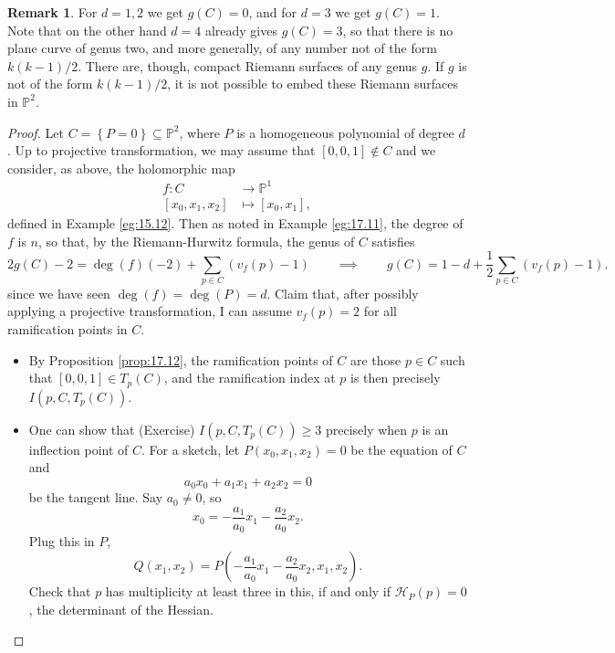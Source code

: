 \documentclass{article}
\renewcommand{\P}{\mathbb{P}}
\renewcommand{\H}{\mathcal{H}}
\newcommand{\rb}[1]{\left( #1 \right)}
\renewcommand{\sb}[1]{\left[ #1 \right]}
\newcommand{\cb}[1]{\left\{ #1 \right\}}
\theoremstyle{definition}\newtheorem{definition}{Definition}[section]
\theoremstyle{definition}\newtheorem{notation}[definition]{Notation}
\theoremstyle{definition}\newtheorem{remark}[definition]{Remark}
\theoremstyle{definition}\newtheorem{example1}[definition]{Example}
\theoremstyle{definition}\newtheorem{fact}{Fact}
\theoremstyle{definition}\newtheorem{exercise}{Exercise}
\theoremstyle{definition}\newtheorem*{example2}{Example}
\begin{document}
\begin{remark}
For $ d = 1, 2 $ we get $ g\rb{C} = 0 $, and for $ d = 3 $ we get $ g\rb{C} = 1 $. Note that on the other hand $ d = 4 $ already gives $ g\rb{C} = 3 $, so that there is no plane curve of genus two, and more generally, of any number not of the form $ k\rb{k - 1} / 2 $. There are, though, compact Riemann surfaces of any genus $ g $. If $ g $ is not of the form $ k\rb{k - 1} / 2 $, it is not possible to embed these Riemann surfaces in $ \P^2 $.
\end{remark}


\begin{proof}
Let $ C = \cb{P = 0} \subseteq \P^2 $, where $ P $ is a homogeneous polynomial of degree $ d $. Up to projective transformation, we may assume that $ \sb{0, 0, 1} \notin C $ and we consider, as above, the holomorphic map
\begin{align*}
f : C & \to \P^1 \\
\sb{x_0, x_1, x_2} & \mapsto \sb{x_0, x_1},
\end{align*}
defined in Example \ref{eg:15.12}. Then as noted in Example \ref{eg:17.11}, the degree of $ f $ is $ n $, so that, by the Riemann-Hurwitz formula, the genus of $ C $ satisfies
$$ 2g\rb{C} - 2 = \deg\rb{f}\rb{-2} + \sum_{p \in C} \rb{v_f\rb{p} - 1} \qquad \implies \qquad g\rb{C} = 1 - d + \dfrac{1}{2}\sum_{p \in C} \rb{v_f\rb{p} - 1}. $$
since we have seen $ \deg\rb{f} = \deg\rb{P} = d $. Claim that, after possibly applying a projective transformation, I can assume $ v_f\rb{p} = 2 $ for all ramification points in $ C $.
\begin{itemize}
\item By Proposition \ref{prop:17.12}, the ramification points of $ C $ are those $ p \in C $ such that $ \sb{0, 0, 1} \in T_p\rb{C} $, and the ramification index at $ p $ is then precisely $ I\rb{p, C, T_p\rb{C}} $.
\item One can show that (Exercise) $ I\rb{p, C, T_p\rb{C}} \ge 3 $ precisely when $ p $ is an inflection point of $ C $. For a sketch, let $ P\rb{x_0, x_1, x_2} = 0 $ be the equation of $ C $ and
$$ a_0x_0 + a_1x_1 + a_2x_2 = 0 $$
be the tangent line. Say $ a_0 \ne 0 $, so
$$ x_0 = -\dfrac{a_1}{a_0}x_1 - \dfrac{a_2}{a_0}x_2. $$
Plug this in $ P $,
$$ Q\rb{x_1, x_2} = P\rb{-\dfrac{a_1}{a_0}x_1 - \dfrac{a_2}{a_0}x_2, x_1, x_2}. $$
Check that $ p $ has multiplicity at least three in this, if and only if $ \H_P\rb{p} = 0 $, the determinant of the Hessian.

\end{itemize}
\end{proof}
\end{document}
